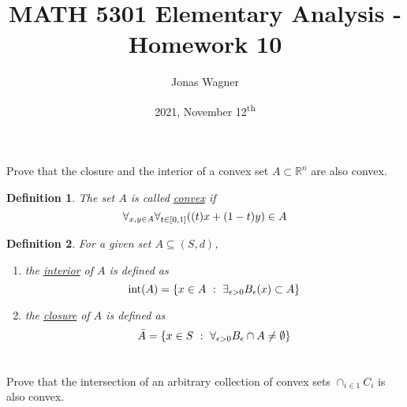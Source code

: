 \documentclass[]{article}
\title{MATH 5301 Elementary Analysis - Homework 10}
\author{Jonas Wagner}
\date{2021, November 12\textsuperscript{th}}
\newcommand{\R}{\mathbb{R}}
\newcommand{\st}{\ : \ }
\newtheorem{definition}{Definition}
\newtheorem{theorem}{Theorem}
\begin{document}
\maketitle

\section{}
Prove that the closure and the interior of a convex set $A \subset \R^n$ are also convex.

\begin{definition}
    The set $A$ is called \emph{\underline{convex}} if
    \[
        \forall_{x, y \in A} \forall_{t \in [0, 1]}
        \qty((t) x + (1 - t) y) \in A
    \]
\end{definition}

\begin{definition}
    For a given set $A \subseteq (S,d)$,
    \begin{enumerate}
        \item the \emph{\underline{interior}} of $A$ is defined as
        \[
            \text{int}(A) = \qty{
                x \in A \st \exists_{\epsilon > 0} B_{\epsilon}(x) \subset A
            }
        \]
        \item the \emph{\underline{closure}} of $A$ is defined as
        \[
            \bar{A} = \qty{
                x \in S \st \forall_{\epsilon > 0} B_\epsilon \cap A \neq \emptyset
            }
        \]
    \end{enumerate}
\end{definition}






















\newpage
\section{}
Prove that the intersection of an arbitrary collection of convex sets $\cap_{i \in 1} C_i$ is also convex.
\end{document}
